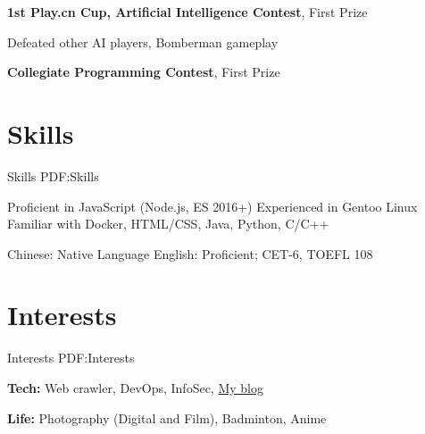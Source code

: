 \documentclass[a4paper,MMMyyyy,nonstop]{simpleresumecv}
\begin{document}
\begin{body}
\GapNoBreak

\textbf{1st Play.cn Cup, Artificial Intelligence Contest}, First Prize
\hfill
\textbf{  }
\begin{detail}
\SubItem
Defeated other AI players, Bomberman gameplay
\end{detail}

\GapNoBreak

\textbf{Collegiate Programming Contest}, First Prize
\hfill
\textbf{  }


\section
{Skills}
{Skills}
{PDF:Skills}

Proficient in JavaScript (Node.js, ES 2016+) \newline
Experienced in Gentoo Linux \newline
Familiar with Docker, HTML/CSS, Java, Python, C/C++

\Gap

Chinese: Native Language \newline
English: Proficient; CET-6, TOEFL 108 \newline


\section
{Interests}
{Interests}
{PDF:Interests}

\textbf{Tech: } Web crawler, DevOps, InfoSec, \href{https://wacky.one/}{My blog}

\textbf{Life: } Photography (Digital and Film), Badminton, Anime

\end{body}
\end{document}
